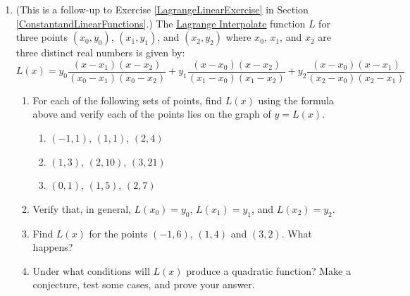 \begin{enumerate}
\setcounter{enumi}{\value{HW}}



\item \label{LagrangeQuadExercise} (This is a follow-up to Exercise \ref{LagrangeLinearExercise} in Section \ref{ConstantandLinearFunctions}.) The \href{https://en.wikipedia.org/wiki/Lagrange_polynomial}{\underline{Lagrange Interpolate}} function $L$ for three points $(x_{0}, y_{0})$, $(x_{1}, y_{1})$, and  $(x_{2}, y_{2})$ where $x_{0}$,  $x_{1}$, and $x_{2}$ are three distinct real numbers  is given by: \[L(x) = y_{0}  \dfrac{(x - x_{1}) (x - x_{2}) }{(x_{0} - x_{1})(x_{0} - x_{2})}+ y_{1}  \dfrac{(x - x_{0}) (x - x_{2}) }{(x_{1} - x_{0})(x_{1} - x_{2})} +  y_{2}  \dfrac{(x - x_{0}) (x - x_{1}) }{(x_{2} - x_{0})(x_{2} - x_{1})}\]

\begin{enumerate}

\item For each of the following sets of points,  find  $L(x)$ using the formula above and verify each of the points lies on the graph of $y = L(x)$.

\begin{multicols}{3}

\begin{enumerate}

\item  $(-1,1)$, $(1,1)$, $(2,4)$ %

\item  $(1,3)$, $(2,10)$, $(3,21)$ %

\item  $(0,1)$,  $(1,5)$, $(2,7)$ %



\end{enumerate}

\end{multicols}

\item  Verify that, in general, $L(x_{0}) = y_{0}$,  $L(x_{1}) = y_{1}$, and $L(x_{2}) = y_{2}$.

\item Find $L(x)$ for the points $(-1, 6)$, $(1, 4)$ and $(3,2)$.  What happens?  %

\item  Under what conditions will $L(x)$ produce a quadratic function?  Make a conjecture, test some cases, and prove your answer.


\end{enumerate}

\setcounter{HW}{\value{enumi}}
\end{enumerate}

